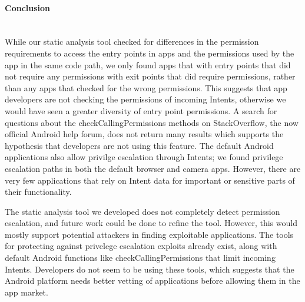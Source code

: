 \documentclass[12pt,a4paper]{article}
\begin{document}
\paragraph{Conclusion} ~\\
While our static analysis tool checked for differences in the permission
requirements to access the entry points in apps and the permissions used by the
app in the same code path, we only found apps that with entry points that did
not require any permissions with exit points that did require permissions,
rather than any apps that checked for the wrong permissions.  This suggests that
app developers are not checking the permissions of incoming Intents, otherwise
we would have seen a greater diversity of entry point permissions. A search for
questions about the checkCallingPermissions methods on StackOverflow, the now
official Android help forum, does not return many results which supports the
hypothesis that developers are not using this feature. The default Android
applications also allow privilge escalation through Intents; we found privilege
escalation paths in both the default browser and camera apps.  However, there
are very few applications that rely on Intent data for important or sensitive
parts of their functionality.

The static analysis tool we developed does not completely detect permission
escalation, and future work could be done to refine the tool. However, this
would mostly support potential attackers in finding exploitable applications.
The tools\cite{lu_chex_2012} for protecting against privelege escalation
exploits already exist, along with default Android functions like
checkCallingPermissions that limit incoming Intents. Developers do not seem to
be using these tools, which suggests that the Android platform needs better
vetting of applications before allowing them in the app market.

\end{document}
